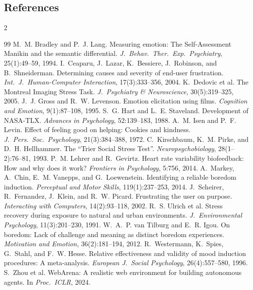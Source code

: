 \documentclass[11pt,a4paper]{article}
\begin{document}
\vspace{-6pt}
\subsection*{References}
\vspace{-2pt}
\begingroup
\footnotesize
\renewcommand{\section}[2]{}
\begin{multicols}{2}
\begin{thebibliography}{99}\setlength{\itemsep}{0pt}
 M.~M. Bradley and P.~J. Lang. Measuring emotion: The Self-Assessment Manikin and the semantic differential. \emph{J.\ Behav.\ Ther.\ Exp.\ Psychiatry}, 25(1):49--59, 1994.
 I.~Ceaparu, J.~Lazar, K.~Bessiere, J.~Robinson, and B.~Shneiderman. Determining causes and severity of end-user frustration. \emph{Int.\ J.\ Human-Computer Interaction}, 17(3):333--356, 2004.
 K.~Dedovic et al. The Montreal Imaging Stress Task. \emph{J.\ Psychiatry \& Neuroscience}, 30(5):319--325, 2005.
 J.~J. Gross and R.~W. Levenson. Emotion elicitation using films. \emph{Cognition and Emotion}, 9(1):87--108, 1995.
 S.~G. Hart and L.~E. Staveland. Development of NASA-TLX. \emph{Advances in Psychology}, 52:139--183, 1988.
 A.~M. Isen and P.~F. Levin. Effect of feeling good on helping: Cookies and kindness. \emph{J.\ Pers.\ Soc.\ Psychology}, 21(3):384--388, 1972.
 C.~Kirschbaum, K.~M. Pirke, and D.~H. Hellhammer. The ``Trier Social Stress Test''. \emph{Neuropsychobiology}, 28(1--2):76--81, 1993.
 P.~M. Lehrer and R.~Gevirtz. Heart rate variability biofeedback: How and why does it work? \emph{Frontiers in Psychology}, 5:756, 2014.
 A.~Markey, A.~Chin, E.~M. Vanepps, and G.~Loewenstein. Identifying a reliable boredom induction. \emph{Perceptual and Motor Skills}, 119(1):237--253, 2014.
 J.~Scheirer, R.~Fernandez, J.~Klein, and R.~W. Picard. Frustrating the user on purpose. \emph{Interacting with Computers}, 14(2):93--118, 2002.
 R.~S. Ulrich et al. Stress recovery during exposure to natural and urban environments. \emph{J.\ Environmental Psychology}, 11(3):201--230, 1991.
 W.~A.~P. van Tilburg and E.~R. Igou. On boredom: Lack of challenge and meaning as distinct boredom experiences. \emph{Motivation and Emotion}, 36(2):181--194, 2012.
 R.~Westermann, K.~Spies, G.~Stahl, and F.~W. Hesse. Relative effectiveness and validity of mood induction procedures: A meta-analysis. \emph{European J.\ Social Psychology}, 26(4):557--580, 1996.
 S.~Zhou et al. WebArena: A realistic web environment for building autonomous agents. In \emph{Proc.\ ICLR}, 2024.
\end{thebibliography}
\end{multicols}
\endgroup
\end{document}
